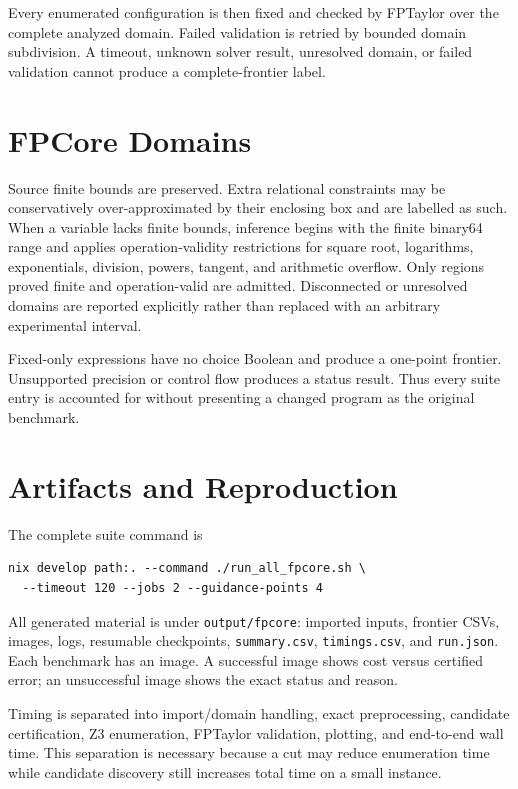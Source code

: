 \documentclass[10pt]{article}
\begin{document}
Every enumerated configuration is then fixed and checked by FPTaylor over the
complete analyzed domain. Failed validation is retried by bounded domain
subdivision. A timeout, unknown solver result, unresolved domain, or failed
validation cannot produce a complete-frontier label.

\section{FPCore Domains}

Source finite bounds are preserved. Extra relational constraints may be
conservatively over-approximated by their enclosing box and are labelled as
such. When a variable lacks finite bounds, inference begins with the finite
binary64 range and applies operation-validity restrictions for square root,
logarithms, exponentials, division, powers, tangent, and arithmetic overflow.
Only regions proved finite and operation-valid are admitted. Disconnected or
unresolved domains are reported explicitly rather than replaced with an
arbitrary experimental interval.

Fixed-only expressions have no choice Boolean and produce a one-point
frontier. Unsupported precision or control flow produces a status result. Thus
every suite entry is accounted for without presenting a changed program as the
original benchmark.

\section{Artifacts and Reproduction}

The complete suite command is
\begin{verbatim}
nix develop path:. --command ./run_all_fpcore.sh \
  --timeout 120 --jobs 2 --guidance-points 4
\end{verbatim}
All generated material is under \texttt{output/fpcore}: imported inputs,
frontier CSVs, images, logs, resumable checkpoints, \texttt{summary.csv},
\texttt{timings.csv}, and \texttt{run.json}. Each benchmark has an image. A
successful image shows cost versus certified error; an unsuccessful image
shows the exact status and reason.

Timing is separated into import/domain handling, exact preprocessing,
candidate certification, Z3 enumeration, FPTaylor validation, plotting, and
end-to-end wall time. This separation is necessary because a cut may reduce
enumeration time while candidate discovery still increases total time on a
small instance.
\end{document}
